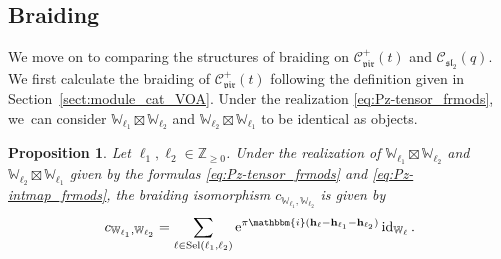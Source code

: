\documentclass[10pt,a4paper]{amsart}
\numberwithin{equation}{section}
\newtheorem{prop}[thm]{Proposition}
 { \theoremstyle{definition}
\newtheorem{defn}[thm]{Definition}
\newtheorem{Note}[thm]{Note}
\newtheorem{exam}[thm]{Example}
\newtheorem{rem}[thm]{Remark} }
\newcommand{\id}{\operatorname{id}}
\newcommand{\bZ}{\mathbb{Z}}
\newcommand{\cC}{\mathcal{C}}
\newcommand{\fsl}{\mathfrak{sl}}
\newcommand{\bbmi}{\mathbbm{i}}
\newcommand{\catQG}{\cC_{\fsl_{2}}}
\newcommand{\catVir}{\cC_{\vir}}
\newcommand{\Sel}{\mathrm{Sel}}
\newcommand{\virmod}{\mathbb{W}}
\newcommand{\vir}{\mathfrak{vir}}
\newcommand{\frweight}[1]{\mathbf{h}_{#1}}
\begin{document}
\subsection{Braiding}
We move on to comparing the structures of braiding on $\catVir^{+}(t)$ and $\catQG(q)$.
We first calculate the braiding of $\catVir^{+}(t)$ following the definition given in Section~\ref{sect:module_cat_VOA}.
Under the realization \eqref{eq:Pz-tensor_frmods}, we~can consider $\virmod_{\ell_{1}}\boxtimes \virmod_{\ell_{2}}$ and $\virmod_{\ell_{2}}\boxtimes\virmod_{\ell_{1}}$ to be identical as objects.
\begin{prop}
\label{prop:braiding_first_row}
Let $\ell_{1},\ell_{2}\in \bZ_{\geq 0}$.
Under the realization of $\virmod_{\ell_{1}}\boxtimes \virmod_{\ell_{2}}$ and $\virmod_{\ell_{2}}\boxtimes\virmod_{\ell_{1}}$ given by the formulas \eqref{eq:Pz-tensor_frmods} and \eqref{eq:Pz-intmap_frmods}, the braiding isomorphism $c_{\virmod_{\ell_{1}},\virmod_{\ell_{2}}}$ is given by
\begin{gather*}
 c_{\virmod_{\ell_{1}},\virmod_{\ell_{2}}}=\sum_{\ell\in \Sel (\ell_{1},\ell_{2})}{\rm e}^{\pi\bbmi (\frweight{\ell}-\frweight{\ell_{1}}-\frweight{\ell_{2}})}\id_{\virmod_{\ell}}.
\end{gather*}
\end{prop}
\end{document}
